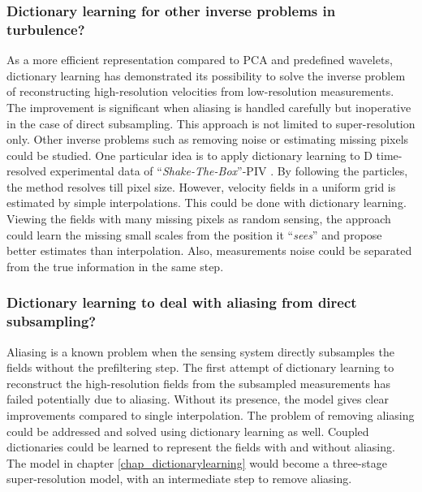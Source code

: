 \subsubsection*{Dictionary learning for other inverse problems in turbulence?} As a more efficient representation compared to PCA and predefined wavelets, dictionary learning has demonstrated its possibility to solve the inverse problem of reconstructing high-resolution velocities from low-resolution measurements. The improvement is significant when aliasing is handled carefully but inoperative in the case of direct subsampling. This approach is not limited to super-resolution only. Other inverse problems such as removing noise or estimating missing pixels could be studied. One particular idea is to apply dictionary learning to D time-resolved experimental data of ``\textit{Shake-The-Box}''-PIV \citep{schroder2015advances}. By following the particles, the method resolves till pixel size. However, velocity fields in a uniform grid is estimated by simple interpolations. This could be done with dictionary learning. Viewing the fields with many missing pixels as random sensing, the approach could learn the missing small scales from the position it ``\textit{sees}'' and propose better estimates than interpolation. Also, measurements noise could be separated from the true information in the same step. 

\subsubsection*{Dictionary learning to deal with aliasing from direct subsampling?} Aliasing is a known problem when the sensing system directly subsamples the fields without the prefiltering step. The first attempt of dictionary learning to reconstruct the high-resolution fields from the subsampled measurements has failed potentially due to aliasing. Without its presence, the model gives clear improvements compared to single interpolation. The problem of removing aliasing could be addressed and solved using dictionary learning as well. Coupled dictionaries could be learned to represent the fields with and without aliasing. The model in chapter \ref{chap_dictionarylearning} would become a three-stage super-resolution model, with an intermediate step to remove aliasing.

